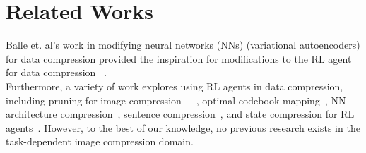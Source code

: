 \section{Related Works}
Balle et. al's work in modifying neural networks (NNs) (variational autoencoders) for data compression provided the inspiration for modifications to the RL agent for data compression ~\cite{DBLP:journals/corr/BalleLS16a}.\\
Furthermore, a variety of work explores using RL agents in data compression, including pruning for image compression~\cite{pruning1}~\cite{pruning2}~\cite{pruning3}, optimal codebook mapping~\cite{8954232}, NN architecture compression~\cite{nn_arch_comp}, sentence compression~\cite{inbook}, and state compression for RL agents~\cite{9387144}. However, to the best of our knowledge, no previous research exists in the task-dependent image compression domain.